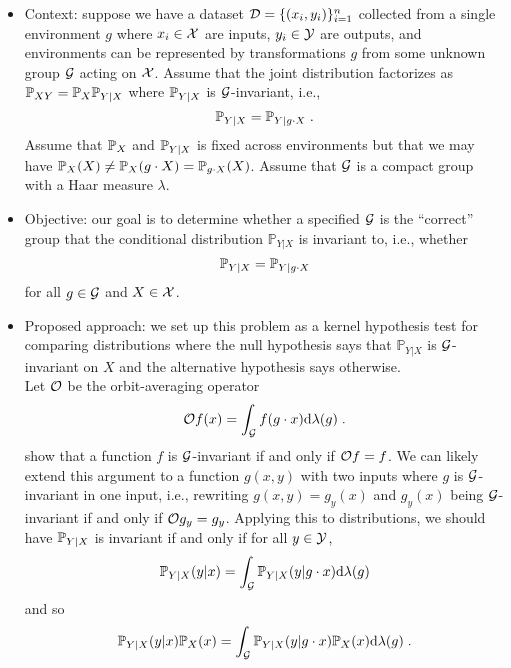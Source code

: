 \begin{itemize}

\item
Context: suppose we have a dataset $\mathcal{D}=\{(x_i,y_i)\}_{i=1}^n$ collected from a single environment $g$ where $x_i\in\mathcal{X}$ are inputs, $y_i\in\mathcal{Y}$ are outputs, and environments can be represented by transformations $g$ from some unknown group $\mathcal{G}$ acting on $\mathcal{X}$. Assume that the joint distribution factorizes as $\mathbb{P}_{XY}=\mathbb{P}_X\mathbb{P}_{Y|X}$ where $\mathbb{P}_{Y|X}$ is $\mathcal{G}$-invariant, i.e.,
\[
\mathbb{P}_{Y|X} = \mathbb{P}_{Y|g\cdot X}\;.
\]
Assume that $\mathbb{P}_X$ and $\mathbb{P}_{Y|X}$ is fixed across environments but that we may have $\mathbb{P}_X(X)\neq\mathbb{P}_X(g\cdot X)=\mathbb{P}_{g\cdot X}(X)$. Assume that $\mathcal{G}$ is a compact group with a Haar measure $\lambda$.

\item
Objective: our goal is to determine whether a specified $\mathcal{G}$ is the ``correct'' group that the conditional distribution $\mathbb{P}_{Y|X}$ is invariant to, i.e., whether
\[
\mathbb{P}_{Y|X} = \mathbb{P}_{Y|g\cdot X}
\]
for all $g\in\mathcal{G}$ and $X\in\mathcal{X}$.

\item
Proposed approach: we set up this problem as a kernel hypothesis test for comparing distributions where the null hypothesis says that $\mathbb{P}_{Y|X}$ is $\mathcal{G}$-invariant on $X$ and the alternative hypothesis says otherwise.
\\

Let $\mathcal{O}$ be the orbit-averaging operator \parencite{Elesedy:2021}
\[
\mathcal{O} f(x) = \int_{\mathcal{G}} f(g\cdot x)\mathrm{d}\lambda(g)\;.
\]
\parencite{Elesedy:2021,Elesedy:2021:equivariant} show that a function $f$ is $\mathcal{G}$-invariant if and only if $\mathcal{O} f=f$. We can likely extend this argument to a function $g(x,y)$ with two inputs where $g$ is $\mathcal{G}$-invariant in one input, i.e., rewriting $g(x,y)=g_y(x)$ and $g_y(x)$ being $\mathcal{G}$-invariant if and only if $\mathcal{O} g_y = g_y$. Applying this to distributions, we should have $\mathbb{P}_{Y|X}$ is invariant if and only if for all $y\in\mathcal{Y}$,
\[
\mathbb{P}_{Y|X}(y|x)=\int_{\mathcal{G}}\mathbb{P}_{Y|X}(y|g\cdot x)\mathrm{d}\lambda(g)
\]
and so
\[
\mathbb{P}_{Y|X}(y|x)\mathbb{P}_X(x)=\int_{\mathcal{G}}\mathbb{P}_{Y|X}(y|g\cdot x)\mathbb{P}_X(x)\mathrm{d}\lambda(g) \;.
\]


\end{itemize}

\todo

